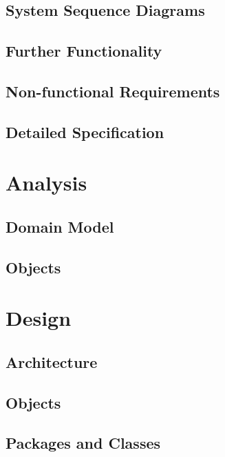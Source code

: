 \documentclass[a4paper,parskip=full]{scrreprt}
\begin{document}
\section{System Sequence Diagrams}
\section{Further Functionality}
\section{Non-functional Requirements}
\section{Detailed Specification}

\chapter{Analysis}
\section{Domain Model}
\section{Objects}

\chapter{Design}
\section{Architecture}
\section{Objects}
\section{Packages and Classes}
\end{document}
